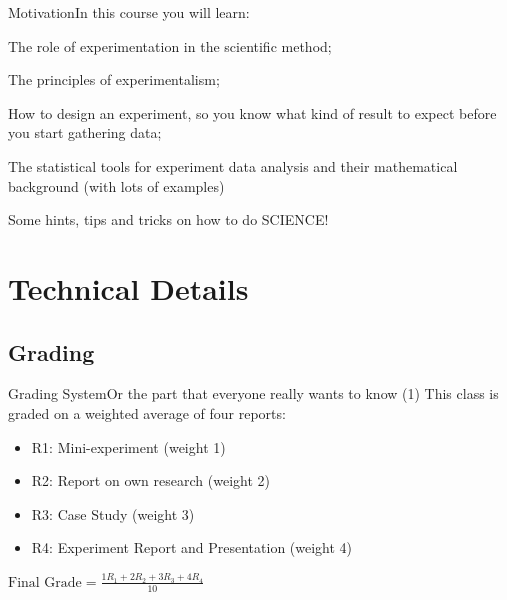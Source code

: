 \documentclass[t]{beamer}
\begin{document}
\begin{ftst}
  {Motivation}{In this course you will learn:}

\vfill
  
  \bitems The role of experimentation in the scientific method;

\vone
  
\item The principles of experimentalism;

  \vone
  
\item How to design an experiment, so you know what kind of result to
  expect before you start gathering data;

  \vone

  
\item The statistical tools for experiment data analysis and their
  mathematical background (with lots of examples)

  \vone
  
\item Some hints, tips and tricks on how to do SCIENCE!\eitem
\end{ftst}


\section{Technical Details}
\subsection{Grading}

\begin{ftst}
  {Grading System}{Or the part that everyone really wants to know (1)}
  This class is graded on a weighted average of four reports:

  \vone
  
  \begin{itemize}
  \item R1: Mini-experiment (weight 1)
  \item R2: Report on own research (weight 2)
  \item R3: Case Study (weight 3)
  \item R4: Experiment Report and Presentation (weight 4)
  \end{itemize}

  \vone

  \begin{center}
  $\text{Final Grade} = \frac{1R_1+2R_2+3R_3+4R_4}{10}$
  \end{center}
  
\end{ftst}
\end{document}
